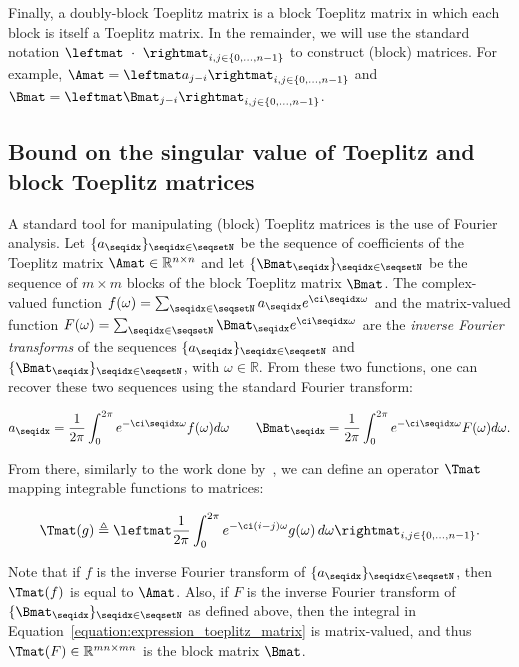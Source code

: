 Finally, a doubly-block Toeplitz matrix is a block Toeplitz matrix in which each block is itself a Toeplitz matrix.
In the remainder, we will use the standard notation $\leftmat\ \cdot\ \rightmat_{i,j \in \{0,\ldots,n-1\}}$ to construct (block) matrices.
For example, $\Amat = \leftmat a_{j-i} \rightmat_{i,j \in \{0,\ldots,n-1\}}$ and $\Bmat = \leftmat \Bmat_{j-i} \rightmat_{i,j \in \{0,\ldots,n-1\}}$.

\subsection{Bound on the singular value of Toeplitz and block Toeplitz matrices}
\label{subsection:generating_function}

A standard tool for manipulating (block) Toeplitz matrices is the use of Fourier analysis.
Let $\{a_\seqidx\}_{\seqidx \in \seqsetN}$ be the sequence of coefficients of the Toeplitz matrix $\Amat \in \mathbb{R}^{n\times n}$ and let $\{\Bmat_\seqidx\}_{\seqidx \in \seqsetN}$ be the sequence of $m\times m$ blocks of the block Toeplitz matrix $\Bmat$.
The complex-valued function $f(\omega) = \sum_{\seqidx \in \seqsetN} a_\seqidx e^{\ci \seqidx \omega}$ and the matrix-valued function $F(\omega) = \sum_{\seqidx \in \seqsetN} \Bmat_\seqidx e^{\ci \seqidx \omega}$ are the \emph{inverse Fourier transforms} of the sequences $\{a_\seqidx\}_{\seqidx \in \seqsetN}$ and $\{\Bmat_\seqidx\}_{\seqidx \in \seqsetN}$, with $\omega \in \mathbb{R}$.
From these two functions, one can recover these two sequences using the standard Fourier transform:

\begin{equation}
    a_\seqidx = \frac{1}{2\pi} \int_0^{2\pi} e^{-\ci \seqidx \omega} f(\omega) d\omega \quad \quad \Bmat_\seqidx = \frac{1}{2\pi} \int_0^{2\pi} e^{-\ci \seqidx \omega} F(\omega) d\omega .
\end{equation}

From there, similarly to the work done by~\citet{gray2006toeplitz,gutierrez2012block}, we can define an operator $\Tmat$ mapping integrable functions to matrices:

\begin{equation}
  \Tmat(g)  \triangleq\leftmat\frac{1}{2\pi}\int_{0}^{2\pi}e^{-\ci(i-j)\omega}g(\omega)\,d\omega\rightmat_{i,j\in\{0,\ldots,n-1\}} . \label{equation:expression_toeplitz_matrix}
\end{equation}

Note that if $f$ is the inverse Fourier transform of $\{a_\seqidx\}_{\seqidx \in \seqsetN}$, then $\Tmat(f)$ is equal to $\Amat$.
Also, if $F$ is the inverse Fourier transform of $\{\Bmat_\seqidx\}_{\seqidx \in \seqsetN}$ as defined above, then the integral in Equation~\ref{equation:expression_toeplitz_matrix} is matrix-valued, and thus $\Tmat(F) \in \mathbb{R}^{mn \times mn}$ is the block matrix $\Bmat$.

